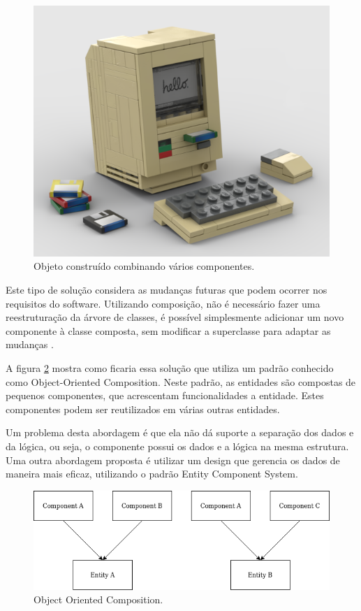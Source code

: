 \begin{figure}
\centering
\includegraphics[scale=0.5]{imagens/macintosh.png}
\caption{Objeto construído combinando vários componentes.} 
\label{fig:lego}
\end{figure}

Este tipo de solução considera as mudanças futuras que podem ocorrer nos requisitos do software. Utilizando composição, não é necessário fazer uma reestruturação da árvore de classes, é possível simplesmente adicionar um novo componente à classe composta, sem modificar a superclasse para adaptar as mudanças \cite{composition}.

A figura \ref{fig:component} mostra como ficaria essa solução que utiliza um padrão conhecido como Object-Oriented Composition. Neste padrão, as entidades são compostas de pequenos componentes, que acrescentam funcionalidades a entidade. Estes componentes podem ser reutilizados em várias outras entidades. 

Um problema desta abordagem é que ela não dá suporte a separação dos dados e da lógica, ou seja, o componente possui os dados e a lógica na mesma estrutura. Uma outra abordagem proposta é utilizar um design que gerencia os dados de maneira mais eficaz, utilizando o padrão Entity Component System.

\begin{figure}
\centering
\includegraphics[scale=0.5]{imagens/component.png}
\caption{Object Oriented Composition.} 
\label{fig:component}
\end{figure}




